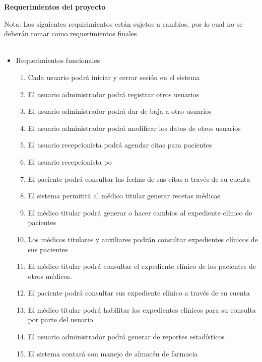 \documentclass[12pt,letterpaper]{article}
\begin{document}
    \newpage
	\pagestyle{plain}
	{
		\par\vspace{0cm}
		{
			\begin{center}

					\Huge\textbf
					{
						Requerimientos del proyecto
					}
			\end{center}
		}
                \justify
                Nota: Los siguientes requirimientos están sujetos a cambios, por lo cual no se deberán tomar como requerimientos finales.
                \\\\
                \begin{itemize}
                    \item Requerimientos funcionales
                    \begin{enumerate}
                        \item Cada usuario podrá iniciar y cerrar sesión en el sistema
						\item El usuario administrador podrá registrar otros usuarios
						\item El usuario administrador podrá dar de baja a otro usuarios
						\item El usuario administrador podrá modificar los datos de otros usuarios
						\item El usuario recepcionista podrá agendar citas para pacientes
						\item El usuario recepcionista po
						\item El paciente podrá consultar las fechas de sus citas a través de su cuenta
						\item El sistema permitirá al médico titular generar recetas médicas
						\item El médico titular podrá generar o hacer cambios al expediente clínico de pacientes
						\item Los médicos titulares y auxiliares podrán consultar expedientes clínicos de sus pacientes
						\item El médico titular podrá consultar el expediente clínico de los pacientes de otros médicos.
						\item El paciente podrá consultar sus expediente clínico a través de su cuenta
						\item El médico titular podrá habilitar los expedientes clínicos para su consulta por parte del usuario
						\item El usuario administrador podrá generar de reportes estadísticos
						\item El sistema contará con manejo de almacén de farmacia

\end{enumerate}
\end{itemize}}
\end{document}
